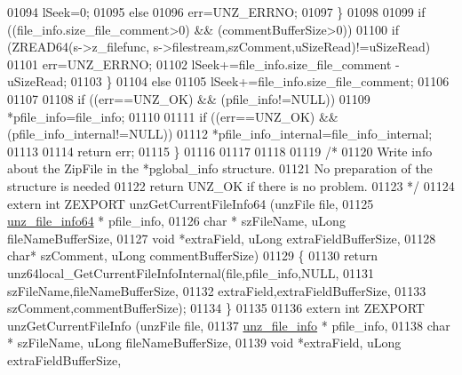 \begin{DoxyCode}
01094                 lSeek=0;
01095             \textcolor{keywordflow}{else}
01096                 err=UNZ\_ERRNO;
01097         \}
01098 
01099         \textcolor{keywordflow}{if} ((file\_info.size\_file\_comment>0) && (commentBufferSize>0))
01100             \textcolor{keywordflow}{if} (ZREAD64(s->z\_filefunc, s->filestream,szComment,uSizeRead)!=uSizeRead)
01101                 err=UNZ\_ERRNO;
01102         lSeek+=file\_info.size\_file\_comment - uSizeRead;
01103     \}
01104     \textcolor{keywordflow}{else}
01105         lSeek+=file\_info.size\_file\_comment;
01106 
01107 
01108     \textcolor{keywordflow}{if} ((err==UNZ\_OK) && (pfile\_info!=NULL))
01109         *pfile\_info=file\_info;
01110 
01111     \textcolor{keywordflow}{if} ((err==UNZ\_OK) && (pfile\_info\_internal!=NULL))
01112         *pfile\_info\_internal=file\_info\_internal;
01113 
01114     \textcolor{keywordflow}{return} err;
01115 \}
01116 
01117 
01118 
01119 \textcolor{comment}{/*}
01120 \textcolor{comment}{  Write info about the ZipFile in the *pglobal\_info structure.}
01121 \textcolor{comment}{  No preparation of the structure is needed}
01122 \textcolor{comment}{  return UNZ\_OK if there is no problem.}
01123 \textcolor{comment}{*/}
01124 \textcolor{keyword}{extern} \textcolor{keywordtype}{int} ZEXPORT unzGetCurrentFileInfo64 (unzFile file,
01125                                           \hyperlink{structunz__file__info64__s}{unz\_file\_info64} * pfile\_info,
01126                                           \textcolor{keywordtype}{char} * szFileName, uLong fileNameBufferSize,
01127                                           \textcolor{keywordtype}{void} *extraField, uLong extraFieldBufferSize,
01128                                           \textcolor{keywordtype}{char}* szComment,  uLong commentBufferSize)
01129 \{
01130     \textcolor{keywordflow}{return} unz64local\_GetCurrentFileInfoInternal(file,pfile\_info,NULL,
01131                                                 szFileName,fileNameBufferSize,
01132                                                 extraField,extraFieldBufferSize,
01133                                                 szComment,commentBufferSize);
01134 \}
01135 
01136 \textcolor{keyword}{extern} \textcolor{keywordtype}{int} ZEXPORT unzGetCurrentFileInfo (unzFile file,
01137                                           \hyperlink{structunz__file__info__s}{unz\_file\_info} * pfile\_info,
01138                                           \textcolor{keywordtype}{char} * szFileName, uLong fileNameBufferSize,
01139                                           \textcolor{keywordtype}{void} *extraField, uLong extraFieldBufferSize,

\end{DoxyCode}
